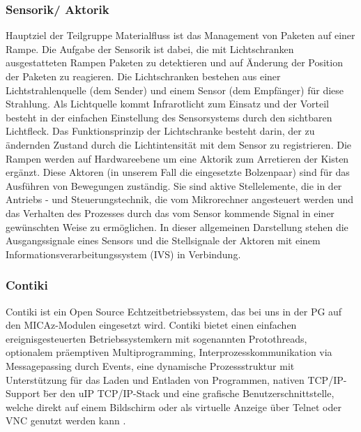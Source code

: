 \subsubsection{Sensorik/ Aktorik}
Hauptziel der Teilgruppe Materialfluss ist das Management von Paketen auf einer Rampe. Die Aufgabe der Sensorik ist dabei, 
die mit Lichtschranken ausgestatteten Rampen Paketen zu detektieren und auf \"Anderung der Position der Paketen zu reagieren.
Die Lichtschranken bestehen aus einer Lichtstrahlenquelle (dem Sender) und einem Sensor (dem Empf\"anger) f\"{u}r diese Strahlung.
Als Lichtquelle kommt Infrarotlicht zum Einsatz und der Vorteil besteht in der einfachen Einstellung des Sensorsystems durch den
sichtbaren Lichtfleck. Das Funktionsprinzip der Lichtschranke besteht darin, der zu  \"andernden Zustand durch die Lichtintensit\"at 
mit dem Sensor zu registrieren. 
Die Rampen werden auf Hardwareebene um eine Aktorik zum Arretieren der Kisten erg\"anzt. Diese Aktoren (in unserem Fall die
eingesetzte Bolzenpaar) sind f\"ur das Ausf\"uhren von Bewegungen zust\"andig. Sie sind aktive Stellelemente, die in der 
Antriebs - und Steuerungstechnik, die vom  Mikrorechner angesteuert werden und das Verhalten des Prozesses durch das vom 
Sensor kommende Signal in einer gew\"{u}nschten Weise zu erm\"oglichen. In dieser allgemeinen Darstellung stehen die 
Ausgangssignale eines Sensors und die Stellsignale der Aktoren mit einem
Informationsverarbeitungssystem (IVS) in Verbindung.

\subsubsection{Contiki}
Contiki ist ein Open Source Echtzeitbetriebssystem, das bei uns in der PG auf den MICAz-Modulen eingesetzt wird.
Contiki bietet einen einfachen ereignisgesteuerten Betriebssystemkern mit sogenannten Protothreads, optionalem 
pr\"aemptiven Multiprogramming, Interprozesskommunikation via Messagepassing durch Events, eine dynamische Prozessstruktur
mit Unterst\"utzung f\"ur das Laden und Entladen von Programmen, nativen TCP/IP-Support \"ber den uIP TCP/IP-Stack und eine 
grafische Benutzerschnittstelle, welche direkt auf einem Bildschirm oder als virtuelle Anzeige \"uber Telnet oder VNC genutzt werden kann \cite{Wikipedia:2013:Online}.
 
